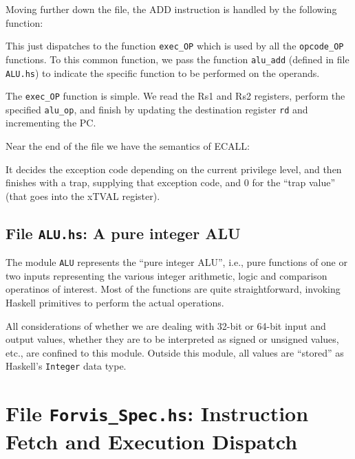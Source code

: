 \documentclass[11pt]{article}
\begin{document}
Moving further down the file, the ADD instruction is handled by the
following function:



This just dispatches to the function \verb|exec_OP| which is used by
all the \verb|opcode_OP| functions.  To this common function, we pass
the function \verb|alu_add| (defined in file \verb|ALU.hs|) to
indicate the specific function to be performed on the operands.

The \verb|exec_OP| function is simple.  We read the Rs1 and Rs2
registers, perform the specified \verb|alu_op|, and finish by updating
the destination register \verb|rd| and incrementing the PC.



Near the end of the file we have the semantics of ECALL:



It decides the exception code depending on the current privilege
level, and then finishes with a trap, supplying that exception code,
and 0 for the ``trap value'' (that goes into the xTVAL register).


\subsection{File {\tt ALU.hs}: A pure integer ALU}

The module \verb|ALU| represents the ``pure integer ALU'', i.e., pure
functions of one or two inputs representing the various integer
arithmetic, logic and comparison operatinos of interest.  Most of the
functions are quite straightforward, invoking Haskell primitives to
perform the actual operations.

All considerations of whether we are dealing with 32-bit or 64-bit
input and output values, whether they are to be interpreted as signed
or unsigned values, etc., are confined to this module.  Outside this
module, all values are ``stored'' as Haskell's \verb|Integer| data
type.


\section{File {\tt Forvis\_Spec.hs}: Instruction Fetch and Execution Dispatch}
\end{document}
